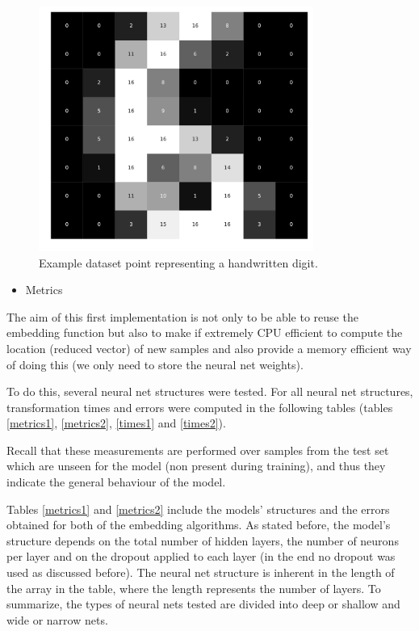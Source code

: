 \documentclass[a4paper,11pt,spanish]{report}
\begin{document}
\begin{figure}[h]
\centering
\includegraphics[width=9cm]{figures/exampledigit.pdf}
\caption{\label{figuredigit}Example dataset point representing a handwritten digit.}
\end{figure}

\begin{itemize}
    \item Metrics
    \label{ssec:met1}
\end{itemize}
The aim of this first implementation is not only to be able to reuse the embedding function but also to make if extremely CPU efficient to compute the location (reduced vector) of new samples and also provide a memory efficient way of doing this (we only need to store the neural net weights). 

To do this, several neural net structures were tested. For all neural net structures, transformation times and errors were computed in the following tables (tables \ref{metrics1}, \ref{metrics2}, \ref{times1} and \ref{times2}).

Recall that these measurements are performed over samples from the test set which are unseen for the model (non present during training), and thus they indicate the general behaviour of the model.

Tables \ref{metrics1} and \ref{metrics2} include the models' structures and the errors obtained for both of the embedding algorithms. As stated before, the model's structure depends on the total number of hidden layers, the number of neurons per layer and on the dropout applied to each layer (in the end no dropout was used as discussed before). The neural net structure is inherent in the length of the array in the table, where the length represents the number of layers. To summarize, the types of neural nets tested are divided into deep or shallow and wide or narrow nets.
\end{document}
